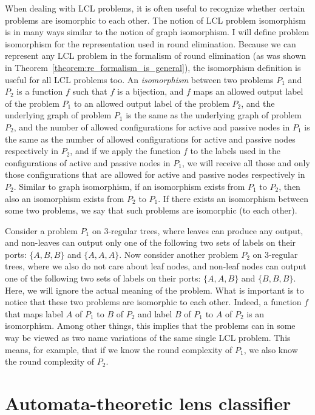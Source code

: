 When dealing with LCL problems, it is often useful to
recognize whether certain problems are isomorphic to
each other. The notion of LCL problem isomorphism is
in many ways similar to the notion of graph isomorphism.
I will define problem isomorphism
for the representation used in round elimination.
Because we can represent any LCL problem in the formalism
of round elimination (as was
shown in Theorem~\ref{theorem:re_formalism_is_general}),
the isomorphism definition is useful
for all LCL problems too.
An \emph{isomorphism} between two problems $P_1$ and $P_2$ is
a function $f$ such that $f$ is a 
bijection, and $f$ maps an allowed output label of the problem
$P_1$ to an allowed output label of the problem $P_2$, and 
the underlying graph of problem $P_1$ is the same as the
underlying graph of problem $P_2$, and the number of
allowed configurations for active and passive nodes in $P_1$ is
the same as the number of allowed configurations for
active and passive nodes respectively in $P_2$, and if we apply the function $f$
to the labels used in the configurations of active and passive nodes in
$P_1$, we will receive
all those and only those configurations that are allowed for
active and passive nodes respectively in $P_2$. Similar to graph isomorphism, if an
isomorphism exists from $P_1$ to $P_2$, then
also an isomorphism exists from $P_2$ to $P_1$. If there exists an
isomorphism between some two problems, we say that such problems
are isomorphic (to each other).

Consider a problem $P_1$ on $3$-regular trees, where leaves can
produce any output, and non-leaves can output only one of the
following two sets of labels on their ports: $\{A, B, B\}$ and
$\{A, A, A\}$. Now consider another problem $P_2$ on $3$-regular
trees, where we also do not care about leaf nodes, and non-leaf
nodes can output one of the following two sets of labels on their
ports: $\{A, A, B\}$ and $\{B, B, B\}$. Here, we will ignore
the actual meaning of the problem. What is important is to
notice that these two
problems are isomorphic to each other. Indeed, a function $f$
that maps label $A$ of $P_1$ to $B$ of $P_2$ and label
$B$ of $P_1$ to $A$ of $P_2$ is an isomorphism.
Among other things, this implies that the problems can
in some way be viewed as two name variations of the same single
LCL problem. This means, for example, that if we know
the round complexity of $P_1$, we also know the round
complexity of $P_2$.

\section{Automata-theoretic lens classifier}

